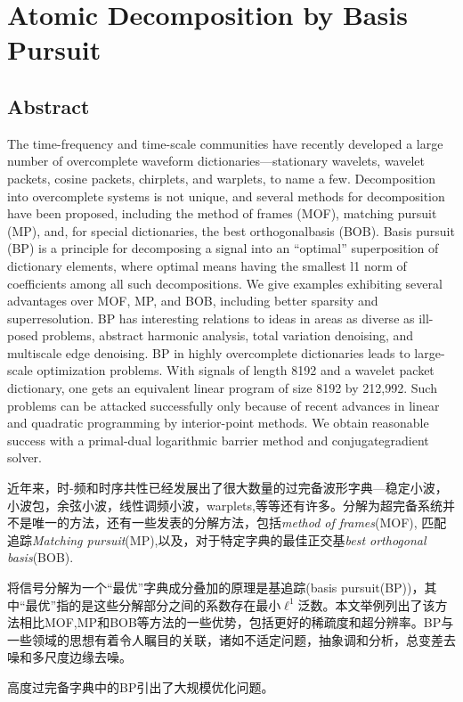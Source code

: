 \chapter{Atomic Decomposition by Basis Pursuit}
\label{chapter4}

\section{Abstract}
The time-frequency and time-scale communities have recently developed a large number of overcomplete waveform dictionaries—stationary wavelets, wavelet packets, cosine packets,
chirplets, and warplets, to name a few. Decomposition into overcomplete systems is not unique, and several methods for decomposition have been proposed, including the method of frames (MOF), matching pursuit (MP), and, for special dictionaries, the best orthogonalbasis (BOB). Basis pursuit (BP) is a principle for decomposing a signal into an “optimal” superposition of dictionary elements, where optimal means having the smallest l1 norm of coefficients among all such decompositions. We give examples exhibiting several advantages over MOF, MP, and BOB, including better sparsity and superresolution. BP has interesting relations to ideas in areas as diverse as ill-posed problems, abstract harmonic analysis, total variation denoising, and multiscale edge denoising. BP in highly overcomplete dictionaries leads to large-scale optimization problems. With signals of length 8192 and a wavelet packet dictionary, one gets an equivalent linear program of size 8192 by 212,992. Such problems can be attacked successfully only because of recent advances in linear and quadratic programming by interior-point methods. We obtain reasonable success with a primal-dual logarithmic barrier method and conjugategradient solver.

近年来，时-频和时序共性已经发展出了很大数量的过完备波形字典---稳定小波，小波包，余弦小波，线性调频小波，warplets,等等还有许多。分解为超完备系统并不是唯一的方法，还有一些发表的分解方法，包括\emph{method of frames}(MOF), 匹配追踪\emph{Matching pursuit}(MP),以及，对于特定字典的最佳正交基\emph{best orthogonal basis}(BOB).

将信号分解为一个“最优”字典成分叠加的原理是基追踪(basis pursuit(BP))，其中“最优”指的是这些分解部分之间的系数存在最小$\ell^1$泛数。本文举例列出了该方法相比MOF,MP和BOB等方法的一些优势，包括更好的稀疏度和超分辨率。BP与一些领域的思想有着令人瞩目的关联，诸如不适定问题，抽象调和分析，总变差去噪和多尺度边缘去噪。

高度过完备字典中的BP引出了大规模优化问题。   
